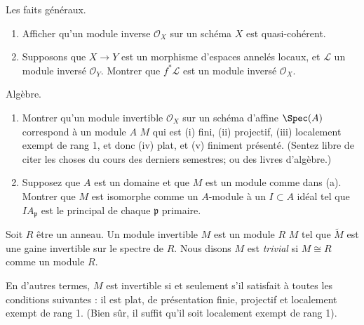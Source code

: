 \begin{exercise}
\label{exercise-general-facts-invertible}
Les faits généraux.
\begin{enumerate}
\item Afficher qu'un module inverse ${\mathcal O}_X$ sur
un schéma $X$ est quasi-cohérent.
\item Supposons que $X\to Y$ est un morphisme d'espaces annelés
locaux, et ${\mathcal L}$ un module inversé ${\mathcal O}_Y$.
Montrer que $f^\ast {\mathcal L}$ est un module inversé ${\mathcal O}_X$.
\end{enumerate}
\end{exercise}

\begin{exercise}
\label{exercise-invertible-algebra}
Algèbre.
\begin{enumerate}
\item Montrer qu'un module invertible ${\mathcal O}_X$ sur un schéma
d'affine $\Spec(A)$ correspond à un module $A$ $M$ qui est (i)
fini, (ii) projectif, (iii) localement exempt de rang 1, et
donc (iv) plat, et (v) finiment présenté. (Sentez libre de citer
les choses du cours des derniers semestres; ou des livres d'algèbre.)
\item Supposez que $A$ est un domaine et que $M$
est un module comme dans (a). Montrer que $M$ est isomorphe comme
un $A$-module à un $I \subset A$ idéal tel que $IA_{\mathfrak p}$ est le
principal de chaque ${\mathfrak p}$ primaire.
\end{enumerate}
\end{exercise}

\begin{definition}
\label{definition-invertible-module}
Soit $R$ être un anneau. Un module invertible {\it $M$} est un module $R$
$M$ tel que $\widetilde M$ est une gaine invertible sur le spectre
de $R$. Nous disons $M$ est {\it trivial} si $M \cong R$ comme
un module $R$.
\end{definition}

\noindent
En d'autres termes, $M$ est invertible si et seulement
s'il satisfait à toutes les conditions suivantes :
il est plat, de présentation finie, projectif et localement
exempt de rang 1. (Bien sûr, il suffit qu'il soit
localement exempt de rang 1).

